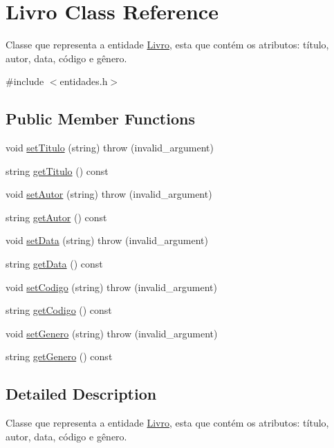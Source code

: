 \hypertarget{classLivro}{}\section{Livro Class Reference}
\label{classLivro}


Classe que representa a entidade \hyperlink{classLivro}{Livro}, esta que contém os atributos\+: título, autor, data, código e gênero.  




{\ttfamily \#include $<$entidades.\+h$>$}

\subsection*{Public Member Functions}
\begin{DoxyCompactItemize}
\item 
void \hyperlink{classLivro_a9a33b5175b4b8666a3dc3ffbbb445b7e}{set\+Titulo} (string)  throw (invalid\+\_\+argument)
\item 
string \hyperlink{classLivro_a4b4e2e74d4fa1a0e6e9a4d6c05dc3bd4}{get\+Titulo} () const
\item 
void \hyperlink{classLivro_adcc86bd3488de769173fe872c7949077}{set\+Autor} (string)  throw (invalid\+\_\+argument)
\item 
string \hyperlink{classLivro_ae8f2ea7e82a3ddd33e1d0e242c43f3e5}{get\+Autor} () const
\item 
void \hyperlink{classLivro_a3530e8f2974791461f080563fd332fa0}{set\+Data} (string)  throw (invalid\+\_\+argument)
\item 
string \hyperlink{classLivro_aaf7d614049f22c09631bae2a5f83c16a}{get\+Data} () const
\item 
void \hyperlink{classLivro_a30b6c41de98f92185b4a5f33dcdf5a66}{set\+Codigo} (string)  throw (invalid\+\_\+argument)
\item 
string \hyperlink{classLivro_ac0bf6014dae1a0a3cb15ffac8b886f13}{get\+Codigo} () const
\item 
void \hyperlink{classLivro_a780f063297948dfc6c20d564ed4a48c3}{set\+Genero} (string)  throw (invalid\+\_\+argument)
\item 
string \hyperlink{classLivro_a00b6085b059571efab6d29630cf95a50}{get\+Genero} () const
\end{DoxyCompactItemize}


\subsection{Detailed Description}
Classe que representa a entidade \hyperlink{classLivro}{Livro}, esta que contém os atributos\+: título, autor, data, código e gênero. 

